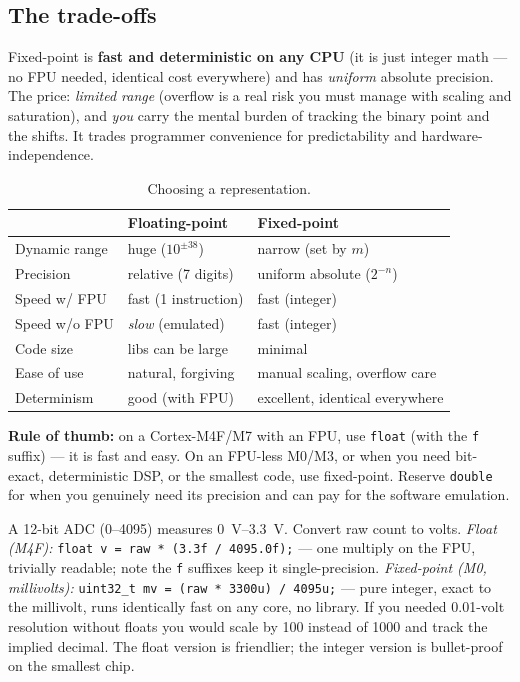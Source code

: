 \documentclass[11pt,a4paper,oneside]{book}
\newcommand{\code}[1]{\texttt{#1}}
\begin{document}
\subsection{The trade-offs}
Fixed-point is \textbf{fast and deterministic on any CPU} (it is just integer
math --- no FPU needed, identical cost everywhere) and has \emph{uniform}
absolute precision. The price: \emph{limited range} (overflow is a real risk you
must manage with scaling and saturation), and \emph{you} carry the mental burden
of tracking the binary point and the shifts. It trades programmer convenience for
predictability and hardware-independence.

\begin{table}[h]
\centering
\caption{Choosing a representation.}
\small
\begin{tabular}{@{}lll@{}}
\toprule
 & \textbf{Floating-point} & \textbf{Fixed-point}\\
\midrule
Dynamic range     & huge ($10^{\pm38}$)     & narrow (set by $m$)\\
Precision         & relative (7 digits)     & uniform absolute ($2^{-n}$)\\
Speed w/ FPU      & fast (1 instruction)    & fast (integer)\\
Speed w/o FPU     & \emph{slow} (emulated)  & fast (integer)\\
Code size         & libs can be large       & minimal\\
Ease of use       & natural, forgiving      & manual scaling, overflow care\\
Determinism       & good (with FPU)         & excellent, identical everywhere\\
\bottomrule
\end{tabular}
\end{table}

\begin{keyidea}
\textbf{Rule of thumb:} on a Cortex-M4F/M7 with an FPU, use \code{float} (with
the \code{f} suffix) --- it is fast and easy. On an FPU-less M0/M3, or when you
need bit-exact, deterministic DSP, or the smallest code, use fixed-point.
Reserve \code{double} for when you genuinely need its precision and can pay for
the software emulation.
\end{keyidea}

\begin{wexample}
A 12-bit ADC (0--4095) measures \qtyrange{0}{3.3}{\volt}. Convert raw count to
volts.
\emph{Float (M4F):} \code{float v = raw * (3.3f / 4095.0f);} --- one multiply on
the FPU, trivially readable; note the \code{f} suffixes keep it single-precision.
\emph{Fixed-point (M0, millivolts):}
\code{uint32\_t mv = (raw * 3300u) / 4095u;} --- pure integer, exact to the
millivolt, runs identically fast on any core, no library. If you needed
\num{0.01}-volt resolution without floats you would scale by 100 instead of 1000
and track the implied decimal. The float version is friendlier; the integer
version is bullet-proof on the smallest chip.
\end{wexample}
\end{document}
